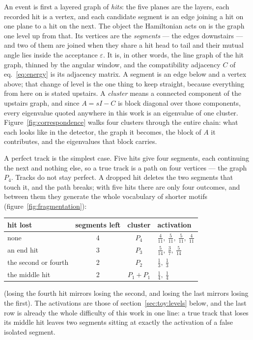 \documentclass[11pt,a4paper]{article}
\begin{document}
An event is first a layered graph of \emph{hits}: the five planes are the
layers, each recorded hit is a vertex, and each candidate segment is an edge
joining a hit on one plane to a hit on the next. The object the Hamiltonian
acts on is the graph one level up from that. Its vertices are the
\emph{segments} --- the edges downstairs --- and two of them are joined when
they share a hit head to tail and their mutual angle lies inside the acceptance
$\varepsilon$. It is, in other words, the line graph of the hit graph, thinned
by the angular window, and the compatibility adjacency $C$ of
eq.~\eqref{eq:energy} is its adjacency matrix. A segment is an edge below and a
vertex above; that change of level is the one thing to keep straight, because
everything from here on is stated upstairs. A \emph{cluster} means a connected
component of the upstairs graph, and since $A=sI-C$ is block diagonal over
those components, every eigenvalue quoted anywhere in this work is an
eigenvalue of one cluster. Figure~\ref{fig:correspondence} walks four clusters
through the entire chain: what each looks like in the detector, the graph it
becomes, the block of $A$ it contributes, and the eigenvalues that block
carries.

A perfect track is the simplest case. Five hits give four segments, each
continuing the next and nothing else, so a true track is a path on four
vertices --- the graph $P_4$. Tracks do not stay perfect. A dropped hit deletes
the two segments that touch it, and the path breaks; with five hits there are
only four outcomes, and between them they generate the whole vocabulary of
shorter motifs (figure~\ref{fig:fragmentation}):
\begin{center}
\renewcommand{\arraystretch}{1.45}
\begin{tabular}{lccl}
\toprule
hit lost & segments left & cluster & activation\\
\midrule
none                & 4 & $P_4$      & $\tfrac{4}{11},\ \tfrac{5}{11},\ \tfrac{5}{11},\ \tfrac{4}{11}$\\
an end hit          & 3 & $P_3$      & $\tfrac{5}{14},\ \tfrac{3}{7},\ \tfrac{5}{14}$\\
the second or fourth& 2 & $P_2$      & $\tfrac13,\ \tfrac13$\\
the middle hit      & 2 & $P_1+P_1$  & $\tfrac14,\ \tfrac14$\\
\bottomrule
\end{tabular}
\renewcommand{\arraystretch}{1.0}
\end{center}
(losing the fourth hit mirrors losing the second, and losing the last mirrors
losing the first). The activations are those of section~\ref{sec:toy:levels}
below, and the last row is already the whole difficulty of this work in one
line: a true track that loses its middle hit leaves two segments sitting at
exactly the activation of a false isolated segment.
\end{document}
